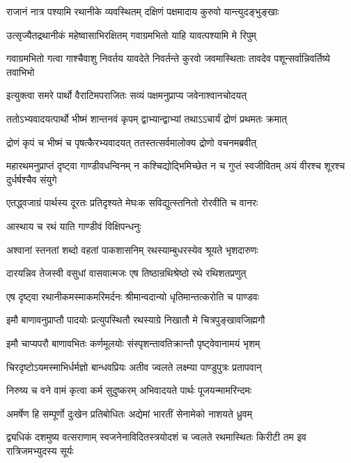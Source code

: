 \twolineshloka
{राजानं नात्र पश्यामि रथानीके व्यवस्थितम्}
{दक्षिणं पक्षमादाय कुरुवो यान्त्युदङ्भुङ्खाः}


\twolineshloka
{उत्सृज्यैतद्रथानीकं महेष्वासाभिरक्षितम्}
{गवाग्रमभितो याहि यावत्पश्यामि मे रिपुम्}


\threelineshloka
{गवाग्रमभितो गत्वा गाश्चैवाशु निवर्तय}
{यावदेते निवर्तन्ते कुरवो जवमास्थिताः}
{तावदेव पशून्सर्वान्निवर्तिष्ये तवाभिभो}



\twolineshloka
{इत्युक्त्वा समरे पार्थो वैराटिमपराजितः}
{सव्यं पक्षमनुप्राप्य जवेनाश्वानचोदयत्}


\twolineshloka
{ततोऽभ्यवादयत्पार्थो भीष्मं शान्तनवं कृपम्}
{द्वाभ्यान्द्वाभ्यां तथाऽऽचार्यं द्रोणं प्रथमतः क्रमात्}


\twolineshloka
{द्रोणं कृपं च भीष्मं च पृषत्कैरभ्यवादयत्}
{ततस्तत्सर्वमालोक्य द्रोणो वचनमब्रवीत्}


\threelineshloka
{महारथमनुप्राप्तं दृष्ट्वा गाण्डीवधन्विनम्}
{न कश्चिद्योद्भिमिच्छेत न च गुप्तं स्वजीवितम्}
{अयं वीरश्च शूरश्च दुर्धर्षश्चैव संयुगे}


\twolineshloka
{एतद्ध्वजाग्रं पार्थस्य दूरतः प्रतिदृश्यते}
{मेघःक सविद्युत्स्तनितो रोरवीति च वानरः}


\onelineshloka
{आस्थाय च रथं याति गाण्डीवं विक्षिपन्धनुः}


\twolineshloka
{अश्वानां स्तनतां शब्दो वहतां पाकशासनिम्}
{रथस्याम्बुधरस्येव श्रूयते भृशदारुणः}


\twolineshloka
{दारयन्निव तेजस्वी वसुधां वासवात्मजः}
{एष तिष्ठान्रथिश्रेष्ठो रथे रथिशतप्रणुत्}


\twolineshloka
{एष दृष्ट्वा रथानीकमस्माकमरिमर्दनः}
{श्रीमान्वदान्यो धृतिमान्तत्करोति च पाण्डवः}


\twolineshloka
{इमौ बाणावनुप्राप्तौ पादयोः प्रत्युपस्थितौ}
{रथस्याग्रे निखातौ मे चित्रपुङ्खावजिह्मगौ}


\twolineshloka
{इमौ चाप्यपरौ बाणावभितः कर्णमूलयोः}
{संस्पृशन्तावतिक्रान्तौ पृष्ट्वेवानामयं भृशम्}


\twolineshloka
{चिरदृष्टोऽयमस्माभिर्धर्मज्ञो बान्धवप्रियः}
{अतीव ज्वलते लक्ष्म्या पाण्डुपुत्रः प्रतापवान्}


\twolineshloka
{निरुष्य च वने वामं कृत्वा कर्म सुदुष्करम्}
{अभिवादयते पार्थः पूजयन्मामरिन्दमः}


\twolineshloka
{अमर्षेण हि सम्पूर्णो दुःखेन प्रतिबोधितः}
{अद्येमां भारतीं सेनामेको नाशयते ध्रुवम्}

\fourlineindentedshloka
{द्व्यधिकं दशमुष्य वत्सराणाम्}
{स्वजनेनाविदितस्त्रयोदशं च}
{ज्वलते रथमास्थितः किरीटी}
{तम इव रात्रिजमभ्युदस्य सूर्यः}

